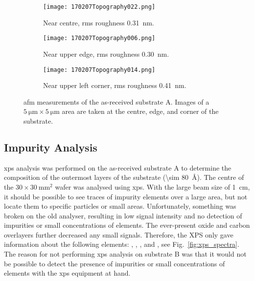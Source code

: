 \begin{figure}[htbp] %
    \centering
    \begin{subfigure}[t]{0.5\linewidth}
        \texttt{[image: 170207Topography022.png]}
        \caption{Near centre, \ac{rms} roughness \SI{0.31}{\nano\metre}.}%
    \end{subfigure}
    \par\bigskip
    \begin{subfigure}[t]{0.5\linewidth}
        \texttt{[image: 170207Topography006.png]}
        \caption{Near upper edge, \ac{rms} roughness \SI{0.30}{\nano\metre}.}%
    \end{subfigure}
    \par\bigskip
    \begin{subfigure}[t]{0.5\linewidth}
        \texttt{[image: 170207Topography014.png]}
        \caption{Near upper left corner, \ac{rms} roughness \SI{0.41}{\nano\metre}.}%
    \end{subfigure}
    \caption[\Ac{afm} of as-received substrate A.]{\Acf{afm} measurements of the as-received substrate A. Images of a $\SI{5}{\micro\metre}\times\SI{5}{\micro\metre}$ area are taken at the centre, edge, and corner of the substrate.}\label{fig:afm_subA}
\end{figure} %




\subsection{Impurity Analysis}

\Ac{xps} analysis was performed on the as-received substrate A to determine the composition of the outermost layers of the substrate (\SI{\sim 80}{\angstrom}). The centre of the $30\times\SI{30}{\milli\metre^2}$  wafer was analysed using \ac{xps}. With the large beam size of \SI{1}{\centi\metre}, it should be possible to see traces of impurity elements over a large area, but not locate them to specific particles or small areas. Unfortunately, something was broken on the old analyser, resulting in low signal intensity and no detection of impurities or small concentrations of elements. The ever-present oxide and carbon overlayers further decreased any small signals. Therefore, the XPS only gave information about the following elements: , , , and , see Fig.~\ref{fig:xps_spectra}. The reason for not performing \ac{xps} analysis on substrate B was that it would not be possible to detect the presence of impurities or small concentrations of elements with the \ac{xps} equipment at hand.

